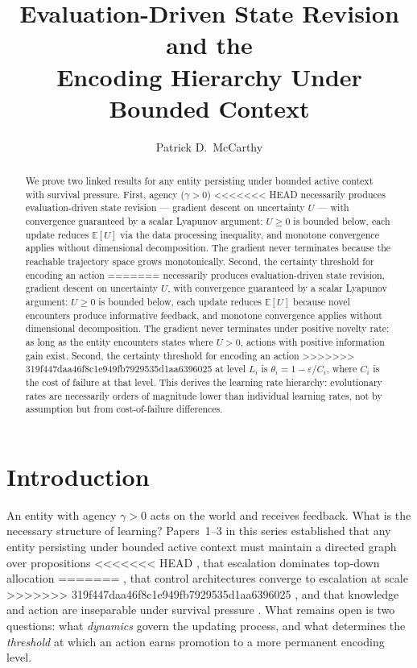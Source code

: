 \documentclass[11pt]{article}
\title{Evaluation-Driven State Revision and the\\Encoding Hierarchy Under Bounded Context}
\author{Patrick D.\ McCarthy}
\date{}
\theoremstyle{definition}
\begin{document}
\maketitle

\begin{abstract}
We prove two linked results for any entity persisting under bounded
active context with survival pressure. First, agency ($\gamma > 0$)
<<<<<<< HEAD
necessarily produces evaluation-driven state revision --- gradient
descent on uncertainty $U$ --- with convergence guaranteed by a scalar
Lyapunov argument: $U \geq 0$ is bounded below, each update reduces
$\mathbb{E}[U]$ via the data processing inequality, and monotone
convergence applies without dimensional decomposition. The gradient
never terminates because the reachable trajectory space grows
monotonically. Second, the certainty threshold for encoding an action
=======
necessarily produces evaluation-driven state revision, gradient
descent on uncertainty $U$, with convergence guaranteed by a scalar
Lyapunov argument: $U \geq 0$ is bounded below, each update reduces
$\mathbb{E}[U]$ because novel encounters produce informative feedback,
and monotone convergence applies without dimensional decomposition. The gradient never terminates under positive novelty rate: as
long as the entity encounters states where $U > 0$, actions with
positive information gain exist. Second, the certainty threshold for encoding an action
>>>>>>> 319f447daa46f8c1e949fb7929535d1aa6396025
at level $L_i$ is $\theta_i = 1 - \varepsilon / C_i$, where $C_i$ is
the cost of failure at that level. This derives the learning rate
hierarchy: evolutionary rates are necessarily orders of magnitude lower
than individual learning rates, not by assumption but from
cost-of-failure differences.
\end{abstract}

\section{Introduction}
\label{sec:intro}

An entity with agency $\gamma > 0$ acts on the world and receives feedback.
What is the necessary structure of learning? Papers~1--3 in this
series established that any entity persisting under bounded active
context must maintain a directed graph over propositions
<<<<<<< HEAD
\cite{McCarthy2026a}, that escalation dominates top-down allocation
=======
\cite{McCarthy2026a}, that control architectures converge to escalation at scale
>>>>>>> 319f447daa46f8c1e949fb7929535d1aa6396025
\cite{McCarthy2026b}, and that knowledge and action are inseparable
under survival pressure \cite{McCarthy2026c}. What remains open is two
questions: what \emph{dynamics} govern the updating process, and what
determines the \emph{threshold} at which an action earns promotion to
a more permanent encoding level.
\end{document}
